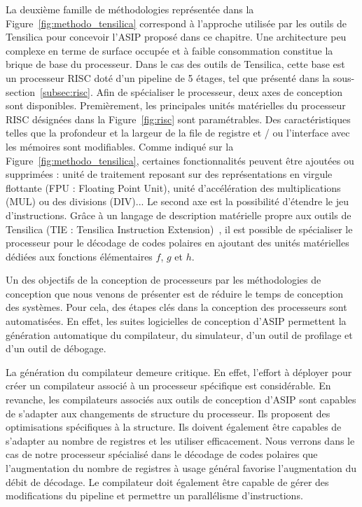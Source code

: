 La deuxième famille de méthodologies représentée dans la Figure~\ref{fig:methodo_tensilica} correspond à l'approche utilisée par les outils de Tensilica pour concevoir l'ASIP proposé dans ce chapitre. Une architecture peu complexe en terme de surface occupée et à faible consommation constitue la brique de base du processeur. Dans le cas des outils de Tensilica, cette base est un processeur RISC doté d'un pipeline de 5 étages, tel que présenté dans la sous-section~\ref{subsec:risc}. Afin de spécialiser le processeur, deux axes de conception sont disponibles. Premièrement, les principales unités matérielles du processeur RISC désignées dans la Figure~\ref{fig:risc} sont paramétrables. Des caractéristiques telles que la profondeur et la largeur de la file de registre et / ou l'interface avec les mémoires sont modifiables. Comme indiqué sur la Figure~\ref{fig:methodo_tensilica}, certaines fonctionnalités peuvent être ajoutées ou supprimées : unité de traitement reposant sur des représentations en virgule flottante (FPU : Floating Point Unit), unité d'accélération des multiplications (MUL) ou des divisions (DIV)... Le second axe est la possibilité d'étendre le jeu d'instructions. Grâce à un langage de description matérielle propre aux outils de Tensilica (TIE : Tensilica Instruction Extension)~\cite{tie2017reference}, il est possible de spécialiser le processeur pour le décodage de codes polaires en ajoutant des unités matérielles dédiées aux fonctions élémentaires $f$, $g$ et $h$.

Un des objectifs de la conception de processeurs par les méthodologies de conception que nous venons de présenter est de réduire le temps de conception des systèmes. Pour cela, des étapes clés dans la conception des processeurs sont automatisées. En effet, les suites logicielles de conception d'ASIP permettent la génération automatique du compilateur, du simulateur, d'un outil de profilage et d'un outil de débogage. 

La génération du compilateur demeure critique. En effet, l'effort à déployer pour créer un compilateur associé à un processeur spécifique est considérable. En revanche, les compilateurs associés aux outils de conception d'ASIP sont capables de s'adapter aux changements de structure du processeur. Ils proposent des optimisations spécifiques à la structure. Ils doivent également être capables de s'adapter au nombre de registres et les utiliser efficacement. Nous verrons dans le cas de notre processeur spécialisé dans le décodage de codes polaires que l'augmentation du nombre de registres à usage général favorise l'augmentation du débit de décodage. Le compilateur doit également être capable de gérer des modifications du pipeline et permettre un parallélisme d'instructions.

